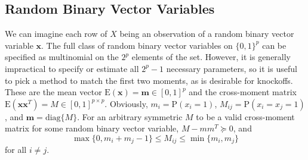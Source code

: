 \documentclass[11pt]{article}
\newcommand{\p}{\mathrm{P}}
\newcommand{\E}{\mathrm{E}}
\newcommand{\diag}[1]{\mathrm{diag}\{#1\}}
\theoremstyle{definition}
\begin{document}
\subsection{Random Binary Vector Variables}
We can imagine each row of $X$ being an observation of a random binary vector variable $\mathbf x$. The full class of random binary vector variables on $\{0,1\}^p$ can be specified as multinomial on the $2^p$ elements of the set. However, it is generally impractical to specify or estimate all $2^p-1$ necessary parameters, so it is useful to pick a method to match the first two moments, as is desirable for knockoffs. These are the mean vector $\E(\mathbf x)=\mathbf{m}\in[0,1]^p$ and the cross-moment matrix $\E(\mathbf x\mathbf x^T)=M\in[0,1]^{p\times p}$. Obviously, $m_i = \p(x_i=1)$, $M_{ij} = \p(x_i=x_j=1)$, and $\mathbf m=\diag{M}$. For an arbitrary symmetric $M$ to be a valid cross-moment matrix for some random binary vector variable, $M-mm^T\succeq0$, and
    \[ \max\{0,m_i+m_j -1\} \leq M_{ij} \leq \min\{m_i,m_j\}\]
    for all $i\neq j$.\cite{2011arXiv1111.0576S}
\end{document}
